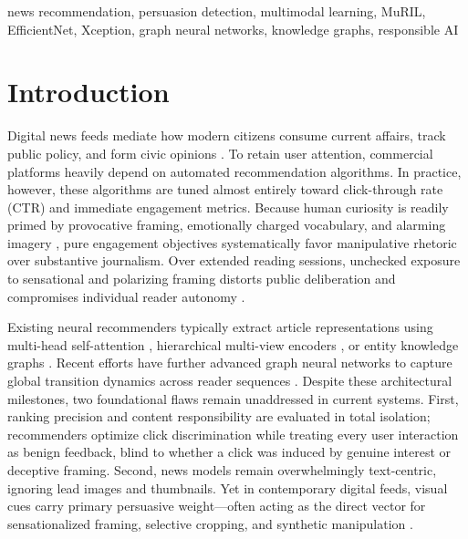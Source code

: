 \documentclass[conference]{IEEEtran}
\begin{document}
\begin{IEEEkeywords}
news recommendation, persuasion detection, multimodal learning, MuRIL, EfficientNet, Xception, graph neural networks, knowledge graphs, responsible AI
\end{IEEEkeywords}

\section{Introduction}
Digital news feeds mediate how modern citizens consume current affairs, track public policy, and form civic opinions \cite{wu_mind}. To retain user attention, commercial platforms heavily depend on automated recommendation algorithms. In practice, however, these algorithms are tuned almost entirely toward click-through rate (CTR) and immediate engagement metrics. Because human curiosity is readily primed by provocative framing, emotionally charged vocabulary, and alarming imagery \cite{martino_propaganda}, pure engagement objectives systematically favor manipulative rhetoric over substantive journalism. Over extended reading sessions, unchecked exposure to sensational and polarizing framing distorts public deliberation and compromises individual reader autonomy \cite{sdg,hardalov_survey}.

Existing neural recommenders typically extract article representations using multi-head self-attention \cite{wu_nrms}, hierarchical multi-view encoders \cite{wu_naml}, or entity knowledge graphs \cite{wang_dkn}. Recent efforts have further advanced graph neural networks to capture global transition dynamics across reader sequences \cite{phan_glory}. Despite these architectural milestones, two foundational flaws remain unaddressed in current systems. First, ranking precision and content responsibility are evaluated in total isolation; recommenders optimize click discrimination while treating every user interaction as benign feedback, blind to whether a click was induced by genuine interest or deceptive framing. Second, news models remain overwhelmingly text-centric, ignoring lead images and thumbnails. Yet in contemporary digital feeds, visual cues carry primary persuasive weight—often acting as the direct vector for sensationalized framing, selective cropping, and synthetic manipulation \cite{dimitrov_semeval2021,rossler_faceforensics}.
\end{document}
